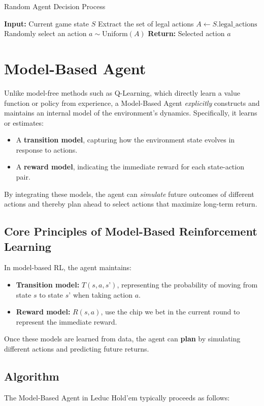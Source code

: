 \documentclass{article}
\begin{document}
\begin{algorithm}[H]
\caption{Random Agent Decision Process}
\begin{algorithmic}[1]
\STATE \textbf{Input:} Current game state $S$
\STATE Extract the set of legal actions $A \leftarrow S.\text{legal\_actions}$
\STATE Randomly select an action $a \sim \text{Uniform}(A)$
\STATE \textbf{Return:} Selected action $a$
\end{algorithmic}
\end{algorithm}




\section{Model-Based Agent}
Unlike model-free methods such as Q-Learning, which directly learn a value function or policy from experience, a Model-Based Agent \emph{explicitly} constructs and maintains an internal model of the environment’s dynamics. Specifically, it learns or estimates:
\begin{itemize}
\item A \textbf{transition model}, capturing how the environment state evolves in response to actions.
\item A \textbf{reward model}, indicating the immediate reward for each state-action pair.
\end{itemize}
By integrating these models, the agent can \emph{simulate} future outcomes of different actions and thereby plan ahead to select actions that maximize long-term return.

\subsection{Core Principles of Model-Based Reinforcement Learning}
In model-based RL, the agent maintains:
\begin{itemize}
\item \textbf{Transition model:} $T(s, a, s’)$, representing the probability of moving from state $s$ to state $s’$ when taking action $a$. 
\item \textbf{Reward model:} $R(s, a)$, use the chip we bet in the current round to represent the immediate reward.
\end{itemize}
Once these models are learned from data, the agent can \textbf{plan} by simulating different actions and predicting future returns.

\subsection{Algorithm}
The Model-Based Agent in Leduc Hold’em typically proceeds as follows:
\end{document}
